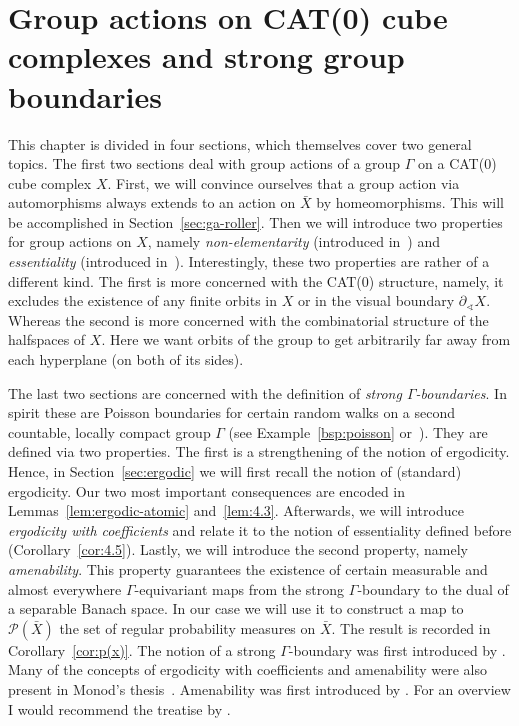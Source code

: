 \section{Group actions on CAT(0) cube complexes and strong group boundaries}
\label{sec:group}
This chapter is divided in four sections, which themselves cover two general topics. The first two sections deal with group actions of a group \(\Gamma\) on a CAT(0) cube complex \(X\). First, we will convince ourselves that a group action via automorphisms always extends to an action on \(\bar X\) by homeomorphisms. This will be accomplished in Section~\ref{sec:ga-roller}. Then we will introduce two properties for group actions on \(X\), namely \emph{non-elementarity} (introduced in~\cite{MR3509968}) and \emph{essentiality} (introduced in~\cite{Caprace2010}). Interestingly, these two properties are rather of a different kind. The first is more concerned with the CAT(0) structure, namely, it excludes the existence of any finite orbits in \(X\) or in the visual boundary \(\partial_\sphericalangle X\). Whereas the second is more concerned with the combinatorial structure of the halfspaces of \(X\). Here we want orbits of the group to get arbitrarily far away from each hyperplane (on both of its sides).

The last two sections are concerned with the definition of \emph{strong \(\Gamma\)-boundaries}. In spirit these are Poisson boundaries for certain random walks on a second countable, locally compact group \(\Gamma\) (see Example~\ref{bsp:poisson} or\ \cite{MR2006560}). They are defined via two properties. The first is a strengthening of the notion of ergodicity. Hence, in Section~\ref{sec:ergodic} we will first recall the notion of (standard) ergodicity. Our two most important consequences are encoded in Lemmas~\ref{lem:ergodic-atomic} and\ \ref{lem:4.3}. Afterwards, we will introduce \emph{ergodicity with coefficients} and relate it to the notion of essentiality defined before (Corollary~\ref{cor:4.5}).  Lastly, we will introduce the second property, namely \emph{amenability}. This property guarantees the existence of certain measurable and almost everywhere \(\Gamma\)-equivariant maps from the strong \(\Gamma\)-boundary to the dual of a separable Banach space. In our case we will use it to construct a map to \(\mathcal{P}(\bar X)\) the set of regular probability measures on \(\bar X\). The result is recorded in Corollary~\ref{cor:p(x)}. The notion of a strong \(\Gamma\)-boundary was first introduced by \textcite{MR2153026}. Many of the concepts of ergodicity with coefficients and amenability were also present in Monod's thesis~\cite{MR2715399}. Amenability was first introduced by \textcite{MR0473096}. For an overview I would recommend the treatise by \textcite{MR2006560}.

